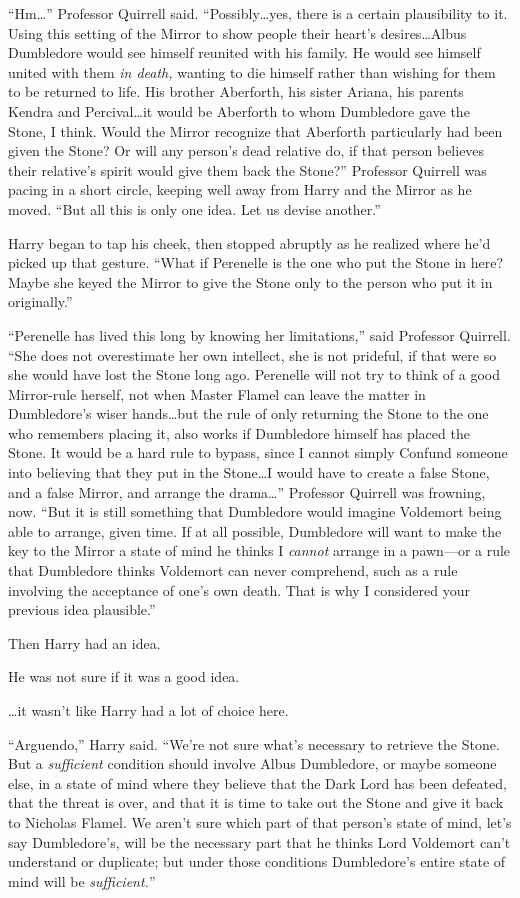 “Hm…” Professor Quirrell said. “Possibly…yes, there is a certain plausibility to it. Using this setting of the Mirror to show people their heart’s desires…Albus Dumbledore would see himself reunited with his family. He would see himself united with them \emph{in death,} wanting to die himself rather than wishing for them to be returned to life. His brother Aberforth, his sister Ariana, his parents Kendra and Percival…it would be Aberforth to whom Dumbledore gave the Stone, I think. Would the Mirror recognize that Aberforth particularly had been given the Stone? Or will any person’s dead relative do, if that person believes their relative’s spirit would give them back the Stone?” Professor Quirrell was pacing in a short circle, keeping well away from Harry and the Mirror as he moved. “But all this is only one idea. Let us devise another.”

Harry began to tap his cheek, then stopped abruptly as he realized where he’d picked up that gesture. “What if Perenelle is the one who put the Stone in here? Maybe she keyed the Mirror to give the Stone only to the person who put it in originally.”

“Perenelle has lived this long by knowing her limitations,” said Professor Quirrell. “She does not overestimate her own intellect, she is not prideful, if that were so she would have lost the Stone long ago. Perenelle will not try to think of a good Mirror-rule herself, not when Master Flamel can leave the matter in Dumbledore’s wiser hands…but the rule of only returning the Stone to the one who remembers placing it, also works if Dumbledore himself has placed the Stone. It would be a hard rule to bypass, since I cannot simply Confund someone into believing that they put in the Stone…I would have to create a false Stone, and a false Mirror, and arrange the drama…” Professor Quirrell was frowning, now. “But it is still something that Dumbledore would imagine Voldemort being able to arrange, given time. If at all possible, Dumbledore will want to make the key to the Mirror a state of mind he thinks I \emph{cannot} arrange in a pawn—or a rule that Dumbledore thinks Voldemort can never comprehend, such as a rule involving the acceptance of one’s own death. That is why I considered your previous idea plausible.”

Then Harry had an idea.

He was not sure if it was a good idea.

…it wasn’t like Harry had a lot of choice here.

“Arguendo,” Harry said. “We’re not sure what’s necessary to retrieve the Stone. But a \emph{sufficient} condition should involve Albus Dumbledore, or maybe someone else, in a state of mind where they believe that the Dark Lord has been defeated, that the threat is over, and that it is time to take out the Stone and give it back to Nicholas Flamel. We aren’t sure which part of that person’s state of mind, let’s say Dumbledore’s, will be the necessary part that he thinks Lord Voldemort can’t understand or duplicate; but under those conditions Dumbledore’s entire state of mind will be \emph{sufficient.}”

